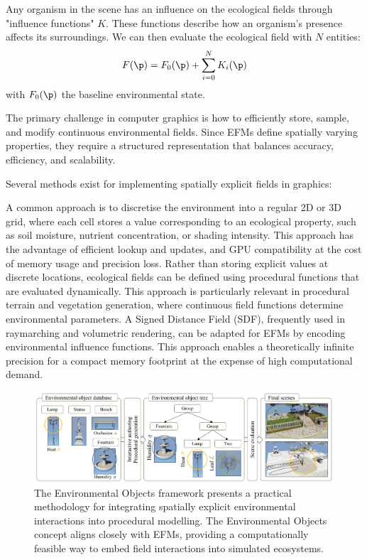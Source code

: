 Any organism in the scene has an influence on the ecological fields through "influence functions" $K$. These functions describe how an organism's presence affects its surroundings. We can then evaluate the ecological field with $N$ entities:
\begin{align}
\label{eq:env-obj-eco-field-computation}
F(\p) = F_0(\p) + \sum_{i=0}^{N}{K_i(\p)}
\end{align}
with $F_0(\p)$ the baseline environmental state.

The primary challenge in computer graphics is how to efficiently store, sample, and modify continuous environmental fields. Since EFMs define spatially varying properties, they require a structured representation that balances accuracy, efficiency, and scalability.

Several methods exist for implementing spatially explicit fields in graphics:
\begin{Itemize}
\Item{} A common approach is to discretise the environment into a regular 2D or 3D grid, where each cell stores a value corresponding to an ecological property, such as soil moisture, nutrient concentration, or shading intensity. This approach has the advantage of efficient lookup and updates, and GPU compatibility at the cost of memory usage and precision loss.
\Item{} Rather than storing explicit values at discrete locations, ecological fields can be defined using procedural functions that are evaluated dynamically. This approach is particularly relevant in procedural terrain and vegetation generation, where continuous field functions determine environmental parameters. A Signed Distance Field (SDF), frequently used in raymarching and volumetric rendering, can be adapted for EFMs by encoding environmental influence functions. This approach enables a theoretically infinite precision for a compact memory footprint at the expense of high computational demand.
\end{Itemize}


\begin{figure}[H]
\centering
\includegraphics[]{env-objs-Grosbellet2016.png}
\caption{The Environmental Objects framework \cite{Grosbellet2016} presents a practical methodology for integrating spatially explicit environmental interactions into procedural modelling. The Environmental Objects concept aligns closely with EFMs, providing a computationally feasible way to embed field interactions into simulated ecosystems.}
\label{fig:env-obj-teaser-grosbellet2016}
\end{figure}

